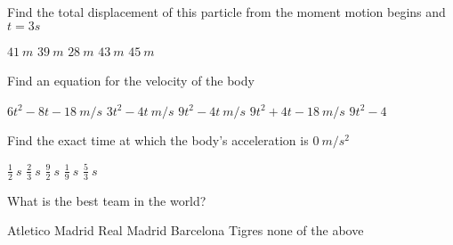 \documentclass[legalpaper, 12pt, addpoints]{exam}
\begin{document}
\begin{questions}
\question Find the total displacement of this particle from the moment motion begins and  $t=3s$
\begin{choices}
	\choice $41 \ m$
	\choice $39 \ m$ 
	\CorrectChoice $28 \ m$
	\choice $43 \ m$
	\choice $45 \ m$ 
\end{choices}

\vspace{0.1in}
\question Find an equation for the velocity of the body
\begin{choices}
	\choice $6t^2 -8t -18 \ m/s$ 
	\choice $3t^2 -4t \ m/s$ 
	\CorrectChoice $9t^2 - 4t \  m/s$ 
	\choice $9t^2 + 4t -18 \ m/s$
	\choice  $9t^2 - 4$
\end{choices}
\vspace{0.1in}

\question Find the exact time at which the body's acceleration is $0  \ m/s^2$	
\begin{choices}
	\choice $\frac{1}{2} \ s $
	\choice $\frac{2}{3} \ s$
	\CorrectChoice $\frac{9}{2} \ s$
	\choice $\frac{1}{9} \ s$
\choice $\frac{5}{3} \ s$
\end{choices}

\question What is the best team in the world?
\begin{choices}
	\CorrectChoice Atletico Madrid
	\choice Real Madrid
	\choice Barcelona
	\choice Tigres
	\choice none of the above
\end{choices}

\vspace{0.10in}

\end{questions}
\end{document}
